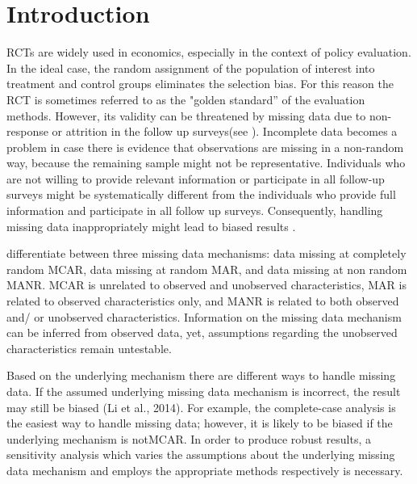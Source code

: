 
\section{Introduction}


\acp{RCT} are widely used in economics, especially in the context of policy evaluation. In the ideal case, the random assignment of the population of interest into treatment and control groups eliminates the selection bias. For this reason the \ac{RCT} is sometimes referred to as the "golden standard'' of the evaluation methods.
However, its validity can be threatened by missing data due to non-response or attrition in the follow up surveys(see \cite{angristmostly2008}). Incomplete data becomes a problem in case there is evidence that observations are missing in a non-random way, because the remaining sample might not be representative. Individuals who are not willing to provide relevant information or participate in all follow-up surveys might be systematically different from the individuals who provide full information and participate in all follow up surveys. Consequently, handling missing data inappropriately might lead to biased results \cite{heckman1976common, lee2009training, kling2007experimental}.


\cite{little1989analysis} differentiate between three missing data mechanisms: data missing at completely random \ac{MCAR}, data missing at random \ac{MAR}, and data missing at non random \ac{MANR}. \ac{MCAR} is unrelated to observed and unobserved characteristics, \ac{MAR} is related to observed characteristics only, and \ac{MANR} is related to both observed and/ or unobserved characteristics. Information on the missing data mechanism can be inferred from observed data, yet, assumptions regarding the unobserved characteristics remain untestable.

Based on the underlying mechanism there are different ways to handle missing data. If the assumed underlying missing data mechanism is incorrect, the result may still be biased (Li et al., 2014). For example, the complete-case analysis is the easiest way to handle missing data; however, it is likely to be biased if the underlying mechanism is not\ac{MCAR}. In order to produce robust results, a sensitivity analysis which varies the assumptions about the underlying missing data mechanism and employs the appropriate methods respectively is necessary.

